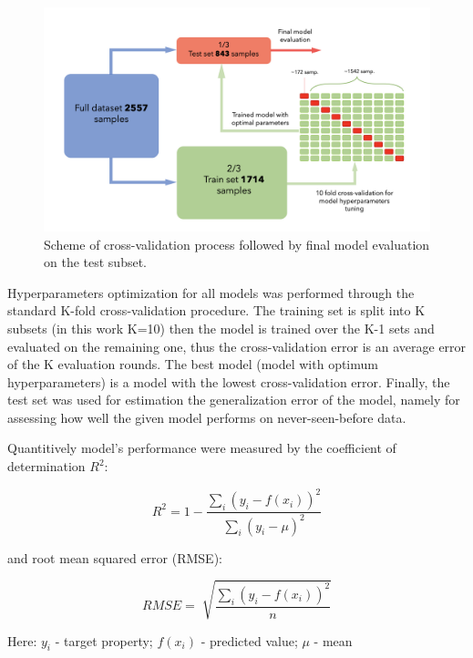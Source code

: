 \begin{figure}[H]
\centering
\captionsetup{justification=centering,margin=2cm}
	\includegraphics[width=160mm]{fig/ml_fig/model_eval.png}
	\caption[Scheme of cross-validation process followed by final model evaluation on the test subset.]{Scheme of cross-validation process followed by final model evaluation on the test subset.}
\label{fig:ml_model_eval}
\end{figure}

Hyperparameters optimization for all models was performed through the standard K-fold cross-validation procedure. The training set is split into K subsets (in this work K=10) then the model is trained over the K-1 sets and evaluated on the remaining one, thus the cross-validation error is an average error of the K evaluation rounds. The best model (model with optimum hyperparameters) is a model with the lowest cross-validation error.
Finally, the test set was used for estimation the generalization error of the model, namely for assessing how well the given model performs on never-seen-before data.

Quantitively model’s performance were measured by the coefficient of determination $R^2$:

\begin{equation}
R^2 = 1 - \frac{\sum \limits_{i}( y_i - f(x_i))^2}{\sum \limits_{i} (y_i - \mu)^2}
\end{equation}

and root mean squared error (RMSE):

\begin{equation}
RMSE = \sqrt[]{\frac{\sum \limits_{i}( y_i - f(x_i))^2}{n}}
\end{equation}

Here: $y_i$ - target property; $f(x_i)$ - predicted value; $\mu$ - mean

